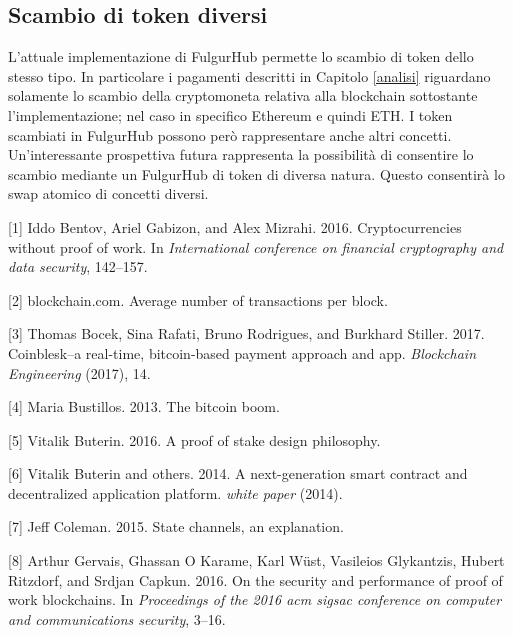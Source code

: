 \documentclass[12pt,italian,]{book}
\begin{document}
\hypertarget{scambio-di-token-diversi}{%
\subsection{Scambio di token diversi}\label{scambio-di-token-diversi}}

L'attuale implementazione di FulgurHub permette lo scambio di token dello stesso tipo. In particolare i pagamenti descritti in Capitolo \ref{analisi} riguardano solamente lo scambio della cryptomoneta relativa alla blockchain sottostante l'implementazione; nel caso in specifico Ethereum e quindi ETH. I token scambiati in FulgurHub possono però rappresentare anche altri concetti. Un'interessante prospettiva futura rappresenta la possibilità di consentire lo scambio mediante un FulgurHub di token di diversa natura. Questo consentirà lo swap atomico di concetti diversi.

\newpage

\hypertarget{refs}{}
\leavevmode\hypertarget{ref-bentov2016cryptocurrencies}{}%
{[}1{]} Iddo Bentov, Ariel Gabizon, and Alex Mizrahi. 2016. Cryptocurrencies without proof of work. In \emph{International conference on financial cryptography and data security}, 142--157.

\leavevmode\hypertarget{ref-BlockchainStats:online}{}%
{[}2{]} blockchain.com. Average number of transactions per block.

\leavevmode\hypertarget{ref-bocek2017coinblesk}{}%
{[}3{]} Thomas Bocek, Sina Rafati, Bruno Rodrigues, and Burkhard Stiller. 2017. Coinblesk--a real-time, bitcoin-based payment approach and app. \emph{Blockchain Engineering} (2017), 14.

\leavevmode\hypertarget{ref-TheBitco9:online}{}%
{[}4{]} Maria Bustillos. 2013. The bitcoin boom.

\leavevmode\hypertarget{ref-AProofof65:online}{}%
{[}5{]} Vitalik Buterin. 2016. A proof of stake design philosophy.

\leavevmode\hypertarget{ref-buterin2014next}{}%
{[}6{]} Vitalik Buterin and others. 2014. A next-generation smart contract and decentralized application platform. \emph{white paper} (2014).

\leavevmode\hypertarget{ref-StateCha92:online}{}%
{[}7{]} Jeff Coleman. 2015. State channels, an explanation.

\leavevmode\hypertarget{ref-gervais2016security}{}%
{[}8{]} Arthur Gervais, Ghassan O Karame, Karl Wüst, Vasileios Glykantzis, Hubert Ritzdorf, and Srdjan Capkun. 2016. On the security and performance of proof of work blockchains. In \emph{Proceedings of the 2016 acm sigsac conference on computer and communications security}, 3--16.
\end{document}

